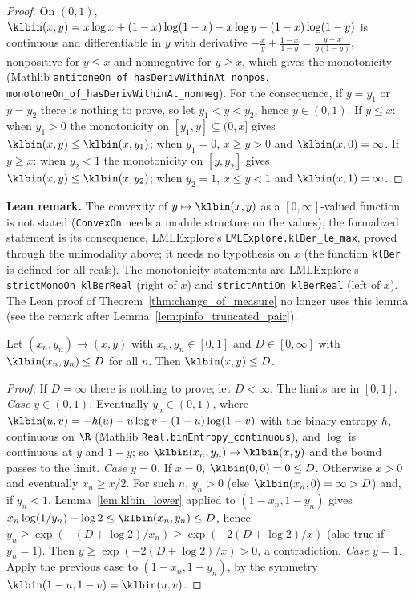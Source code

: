 \begin{proof}
\leanok
On $(0, 1)$, $\klbin(x, y) = x\log x + (1-x)\log(1-x) - x\log y - (1-x)\log(1-y)$ is continuous
and differentiable in $y$ with derivative $-\frac{x}{y} + \frac{1-x}{1-y} = \frac{y - x}{y(1-y)}$,
nonpositive for $y \le x$ and nonnegative for $y \ge x$, which gives the monotonicity (Mathlib
\texttt{antitoneOn\_of\_hasDerivWithinAt\_nonpos}, \texttt{monotoneOn\_of\_hasDerivWithinAt\_nonneg}).
For the consequence, if $y = y_1$ or $y = y_2$ there is nothing to prove, so let
$y_1 < y < y_2$, hence $y \in (0,1)$. If $y \le x$: when $y_1 > 0$ the monotonicity on
$[y_1, y] \subseteq (0, x]$ gives $\klbin(x, y) \le \klbin(x, y_1)$; when $y_1 = 0$, $x \ge y > 0$
and $\klbin(x, 0) = \infty$. If $y \ge x$: when $y_2 < 1$ the monotonicity on $[y, y_2]$ gives
$\klbin(x, y) \le \klbin(x, y_2)$; when $y_2 = 1$, $x \le y < 1$ and $\klbin(x, 1) = \infty$.
\end{proof}

\textbf{Lean remark.} The convexity of $y \mapsto \klbin(x,y)$ as a $[0,\infty]$-valued function
is not stated (\texttt{ConvexOn} needs a module structure on the values); the formalized statement
is its consequence, LMLExplore's \texttt{LMLExplore.klBer\_le\_max}, proved through the
unimodality above; it needs no hypothesis on $x$ (the function \texttt{klBer} is defined for all
reals). The monotonicity statements are LMLExplore's \texttt{strictMonoOn\_klBerReal} (right of
$x$) and \texttt{strictAntiOn\_klBerReal} (left of $x$). The Lean proof of
Theorem~\ref{thm:change_of_measure} no longer uses this lemma (see the remark after
Lemma~\ref{lem:pinfo_truncated_pair}).

\begin{lemma}\label{lem:pinfo_klbin_lsc}
\leanok
{}
Let $(x_n, y_n) \to (x, y)$ with $x_n, y_n \in [0, 1]$ and $D \in [0, \infty]$ with
$\klbin(x_n, y_n) \le D$ for all $n$. Then $\klbin(x, y) \le D$.
\end{lemma}

\begin{proof}
\leanok
If $D = \infty$ there is nothing to prove; let $D < \infty$. The limits are in $[0,1]$.
\emph{Case $y \in (0, 1)$.} Eventually $y_n \in (0,1)$, where
$\klbin(u, v) = -h(u) - u\log v - (1-u)\log(1-v)$ with the binary entropy $h$, continuous on
$\R$ (Mathlib \texttt{Real.binEntropy\_continuous}), and $\log$ is continuous at $y$ and $1 - y$;
so $\klbin(x_n, y_n) \to \klbin(x, y)$ and the bound passes to the limit.
\emph{Case $y = 0$.} If $x = 0$, $\klbin(0, 0) = 0 \le D$. Otherwise $x > 0$ and eventually
$x_n \ge x/2$. For such $n$, $y_n > 0$ (else $\klbin(x_n, 0) = \infty > D$) and, if $y_n < 1$,
Lemma~\ref{lem:klbin_lower} applied to $(1 - x_n, 1 - y_n)$ gives
$x_n\log(1/y_n) - \log 2 \le \klbin(x_n, y_n) \le D$, hence
$y_n \ge \exp(-(D + \log 2)/x_n) \ge \exp(-2(D + \log 2)/x)$ (also true if $y_n = 1$). Then
$y \ge \exp(-2(D + \log 2)/x) > 0$, a contradiction.
\emph{Case $y = 1$.} Apply the previous case to $(1 - x_n, 1 - y_n)$, by the symmetry
$\klbin(1-u, 1-v) = \klbin(u, v)$.
\end{proof}

